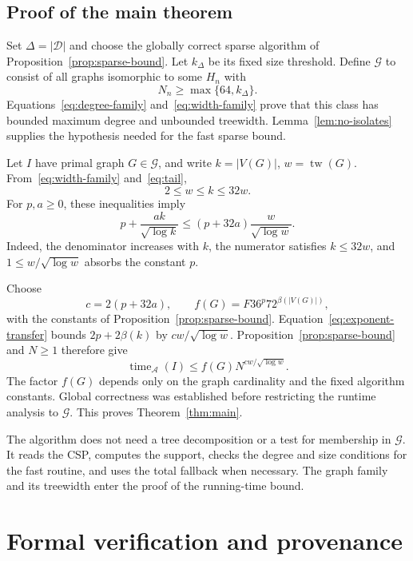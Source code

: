 \documentclass[11pt,reqno]{amsart}
\numberwithin{equation}{section}
\theoremstyle{definition}
\theoremstyle{remark}
\newcommand{\tw}{\operatorname{tw}}
\begin{document}
\subsection{Proof of the main theorem}

Set $\Delta=|\mathcal D|$ and choose the globally correct sparse algorithm of Proposition~\ref{prop:sparse-bound}. Let $k_\Delta$ be its fixed size threshold. Define $\mathcal G$ to consist of all graphs isomorphic to some $H_n$ with
\begin{equation}\label{eq:tail}
 N_n\ge\max\{64,k_\Delta\}.
\end{equation}
Equations~\eqref{eq:degree-family} and~\eqref{eq:width-family} prove that this class has bounded maximum degree and unbounded treewidth. Lemma~\ref{lem:no-isolates} supplies the hypothesis needed for the fast sparse bound.

Let $I$ have primal graph $G\in\mathcal G$, and write $k=|V(G)|$, $w=\tw(G)$. From~\eqref{eq:width-family} and~\eqref{eq:tail},
\begin{equation}\label{eq:comparison}
 2\le w\le k\le32w.
\end{equation}
For $p,a\ge0$, these inequalities imply
\begin{equation}\label{eq:exponent-transfer}
 p+\frac{ak}{\sqrt{\log k}}
 \le(p+32a)\frac{w}{\sqrt{\log w}}.
\end{equation}
Indeed, the denominator increases with $k$, the numerator satisfies $k\le32w$, and $1\le w/\sqrt{\log w}$ absorbs the constant $p$.

Choose
\[
 c=2(p+32a),\qquad
 f(G)=F36^p72^{\beta(|V(G)|)},
\]
with the constants of Proposition~\ref{prop:sparse-bound}. Equation~\eqref{eq:exponent-transfer} bounds $2p+2\beta(k)$ by $cw/\sqrt{\log w}$. Proposition~\ref{prop:sparse-bound} and $N\ge1$ therefore give
\[
 \operatorname{time}_{\mathcal A}(I)
 \le f(G)N^{c w/\sqrt{\log w}}.
\]
The factor $f(G)$ depends only on the graph cardinality and the fixed algorithm constants. Global correctness was established before restricting the runtime analysis to $\mathcal G$. This proves Theorem~\ref{thm:main}.

The algorithm does not need a tree decomposition or a test for membership in $\mathcal G$. It reads the CSP, computes the support, checks the degree and size conditions for the fast routine, and uses the total fallback when necessary. The graph family and its treewidth enter the proof of the running-time bound.

\section{Formal verification and provenance}\label{sec:formal}
\end{document}
